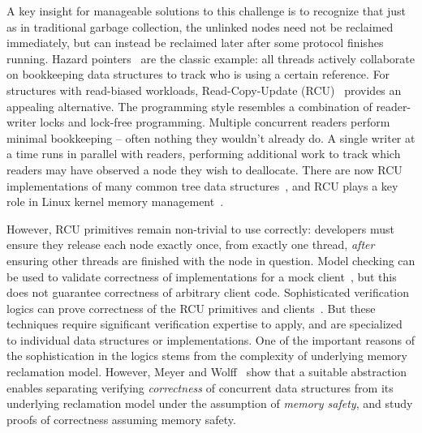A key insight for manageable solutions to this challenge is to recognize that just as in traditional garbage collection, the unlinked nodes need not be reclaimed immediately, but can instead be reclaimed later after some protocol finishes running.
Hazard pointers~\cite{Michael:2004:HPS:987524.987595} are the classic example: all threads actively collaborate on bookkeeping data structures to track who is using a certain reference.
For structures with read-biased workloads, Read-Copy-Update (RCU)~\cite{Mckenney:2004:EDD:1048173} provides an appealing alternative. The programming style resembles a combination of reader-writer locks and lock-free programming. 
Multiple concurrent readers perform minimal bookkeeping -- often nothing they wouldn't already do.  A single writer at a time runs in parallel with readers, performing additional work to track which readers may have observed a node they wish to deallocate.
There are now RCU implementations of many common tree data structures~\cite{urcu_ieee,Triplett:2011:RSC:2002181.2002192,DBLP:conf/asplos/ClementsKZ12,mc_report,Arbel:2014:CUR:2611462.2611471,Kung:1980:CMB:320613.320619}, and
RCU plays a key role in Linux kernel memory management~\cite{Mckenney01read-copyupdate}.

However, RCU primitives remain non-trivial to use correctly: developers must ensure they release each node exactly once, from exactly one thread, \emph{after} ensuring other threads are finished with the node in question.
Model checking can be used to validate correctness of implementations for a mock client~\cite{LiangMKM16,Desnoyers:2013:MSM:2506164.2506174,Kokologiannakis:2017:SMC:3092282.3092287,DBLP:conf/cav/AlglaveKT13}, but this does not guarantee correctness of arbitrary client code.
Sophisticated verification logics can prove correctness of the RCU primitives and clients~\cite{Gotsman:2013:VCM:2450268.2450289,fu2010reasoning,verrcu,Mandrykin:2016:TDV:3001219.3001297}.
But these techniques require significant verification expertise to apply, and are specialized to individual data structures or implementations.
One of the important reasons of the sophistication in the logics stems from the complexity of underlying memory reclamation model. However, Meyer and Wolff~\cite{myr} show that a suitable abstraction enables separating verifying \textit{correctness} of concurrent data structures from its underlying reclamation model under the assumption of \textit{memory safety}, and study proofs of correctness assuming memory safety.

